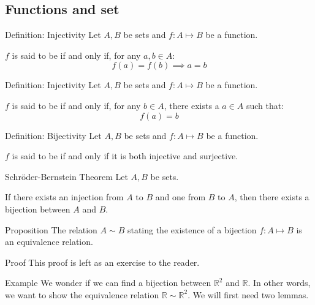 \documentclass[a4paper]{article}
\begin{document}
\subsection{Functions and set}

\begin{parag}{Definition: Injectivity}
    Let $A, B$ be sets and $f: A \mapsto B$ be a function. 

    $f$ is said to be  if and only if, for any $a, b \in A$: 
    \[f\left(a\right) = f\left(b\right) \implies a = b\]
\end{parag}

\begin{parag}{Definition: Injectivity}
    Let $A, B$ be sets and $f: A \mapsto B$ be a function. 

    $f$ is said to be  if and only if, for any $b \in A$, there exists a $a \in A$ such that: 
    \[f\left(a\right) = b\]
\end{parag}

\begin{parag}{Definition: Bijectivity}
    Let $A, B$ be sets and $f: A \mapsto B$ be a function. 

    $f$ is said to be  if and only if it is both injective and surjective.
\end{parag}

\begin{parag}{Schröder-Bernstein Theorem}
    Let $A, B$ be sets.

    If there exists an injection from $A$ to $B$ and one from $B$ to $A$, then there exists a bijection between $A$ and $B$.
\end{parag}

\begin{parag}{Proposition}
    The relation $A \sim B$ stating the existence of a bijection $f: A \mapsto B$ is an equivalence relation.

    \begin{subparag}{Proof}
        This proof is left as an exercise to the reader.
    \end{subparag}
\end{parag}

\begin{parag}{Example}
    We wonder if we can find a bijection between $\mathbb{R}^2$ and $\mathbb{R}$. In other words, we want to show the equivalence relation $\mathbb{R} \sim \mathbb{R}^2$. We will first need two lemmas.
\end{parag}
\end{document}
